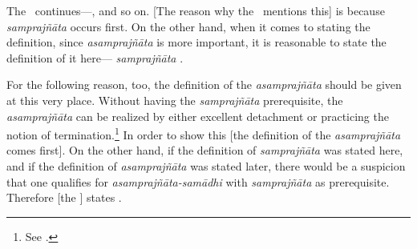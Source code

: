 The%
 \bhasya\ continues---, and so on.  [The reason why the \bhasya\ mentions this] is because \emph{samprajñāta\/} occurs first.  On the other hand, when it comes to stating the definition, since  \emph{asamprajñāta\/} is more important, it is reasonable to state the definition of it here--- \emph{samprajñāta} .%

For%
 the following reason, too, the definition of the \emph{%
  asamprajñāta\/} should be given at this very place.  Without
having the \emph{samprajñāta} prerequisite, the \emph{asamprajñāta} can
be realized by either excellent detachment or practicing the notion
of termination.\footnote{See .}  In order to show this [the
definition of the \emph{asamprajñāta} comes first].  On the other
hand, if the definition of \emph{samprajñāta\/}
was stated here, and if the definition of \emph{%
  asamprajñāta} was stated later, there would be a suspicion that one
qualifies for \emph{asamprajñāta-samādhi\/} with \emph{%
  samprajñāta\/} as prerequisite.  Therefore [the \Bhasyakara] states .

